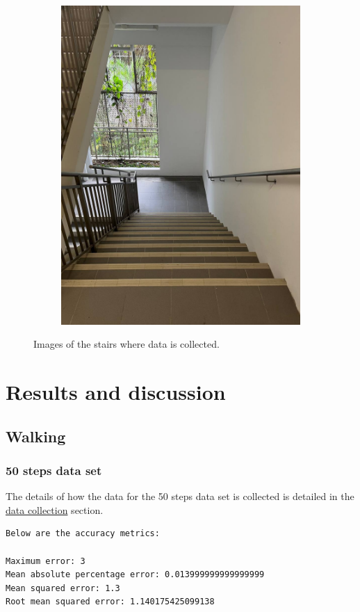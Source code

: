 \documentclass[12pt]{report}
\begin{document}
\begin{figure}[h]
\begin{subfigure}[b]{0.26\textwidth}
        \includegraphics[width=\textwidth]{stairs-down}
    \end{subfigure}
    \caption{Images of the stairs where data is collected.}
\end{figure}
\chapter{Results and discussion}
\label{sec:org46cd857}
\label{orgb796370}
\section{Walking}
\label{sec:orgc0160a3}

\subsection{50 steps data set}
\label{sec:orged2f1e5}
The details of how the data for the 50 steps data set is
collected is detailed in the \hyperref[orgdcbbb87]{data collection} section.
\label{org5d2a2b2}
\begin{verbatim}
Below are the accuracy metrics:

Maximum error: 3
Mean absolute percentage error: 0.013999999999999999
Mean squared error: 1.3
Root mean squared error: 1.140175425099138
\end{verbatim}
\end{document}

